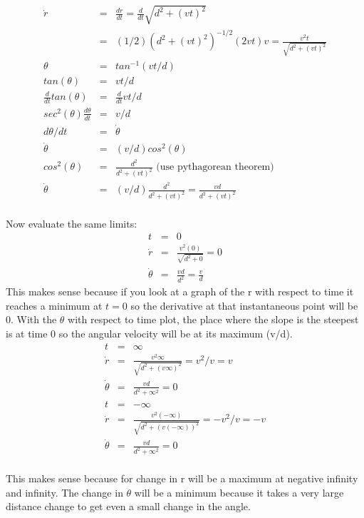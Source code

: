 \documentclass[11pt]{amsart}
\begin{document}
\begin{eqnarray*}
\dot{r} &=& \frac{dr}{dt} = \frac{d}{dt}\sqrt{d^{2}+(vt)^{2}} \\
&=& (1/2)(d^{2}+(vt)^{2})^{-1/2}(2vt)v = \frac{v^{2}t}{\sqrt{d^{2}+(vt)^{2}}} \\ 
\theta&=& tan^{-1}(vt/d) \\
tan(\theta) &=& vt/d \\
\frac{d}{dt}tan(\theta) &=& \frac{d}{dt}vt/d \\
sec^{2}(\theta)\frac{d\theta}{dt} &=& v/d \\
d\theta/dt &=& \dot{\theta} \\
\dot{\theta} &=& (v/d)cos^{2}(\theta) \\
cos^{2}(\theta) &=& \frac{d^{2}}{d^{2}+(vt)^{2}} \mbox{ (use pythagorean theorem)}\\
\dot{\theta} &=& (v/d)\frac{d^{2}}{d^{2}+(vt)^{2}} = \frac{vd}{d^{2}+(vt)^{2}} 
\end{eqnarray*} \\ 
Now evaluate the same limits: \\
\begin{eqnarray*} 
t &=& 0 \\
\dot{r} &=& \frac{v^{2}(0)}{\sqrt{d^{2}+0}} = 0 \\
\dot{\theta} &=& \frac{vd}{d^{2}} = \frac{v}{d} 
\end{eqnarray*}
This makes sense because if you look at a graph of the r with respect to time it reaches a minimum at $t=0$ so the derivative at that instantaneous point will be 0. With the $\theta$ with respect to time plot, the place where the slope is the steepest is at time 0 so the angular velocity will be at its maximum (v/d). \\
\begin{eqnarray*}
t &=& \infty \\
\dot{r} &=& \frac{v^{2}\infty}{\sqrt{d^{2}+(v\infty)^{2}}} = v^{2}/v = v \\
\dot{\theta} &=& \frac{vd}{d^{2}+\infty^{2}} =0 \\
t &=& -\infty \\
\dot{r} &=& \frac{v^{2}(-\infty)}{\sqrt{d^{2}+(v(-\infty))^{2}}} = -v^{2}/v = -v \\
\dot{\theta} &=& \frac{vd}{d^{2}+\infty^{2}} =0 
\end{eqnarray*} \\
This makes sense because for change in r will be a maximum at negative infinity and infinity. The change in $\theta$ will be a minimum because it takes a very large distance change to get even a small change in the angle. \\ \\
\end{document}
